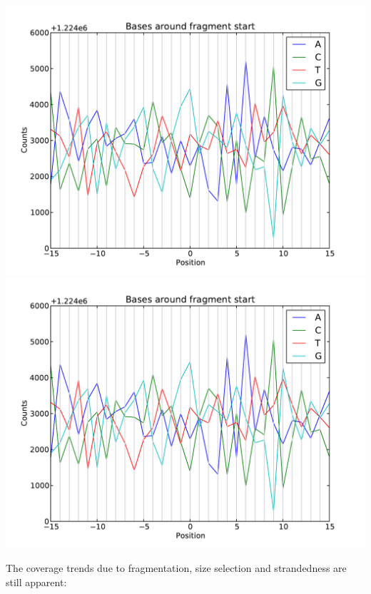 \begin{center}
\includegraphics[scale=0.6,page=1]{../src/test/pos_bias/pb_after_noprim.pdf}
\\
\includegraphics[scale=0.6,page=2]{../src/test/pos_bias/pb_after_noprim.pdf}
\end{center}

The coverage trends due to fragmentation, size selection and strandedness are still apparent:

